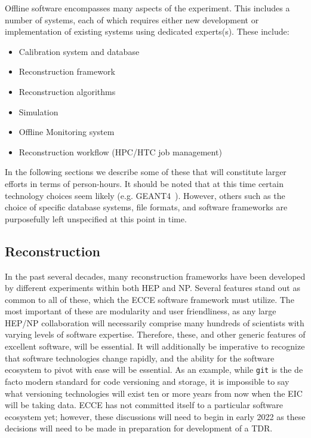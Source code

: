 

Offline software encompasses many aspects of the experiment. This includes a number of systems, each of which requires either new development or implementation of existing systems using dedicated experts(s). These include:

\begin{itemize}
    \item Calibration system and database
    \item Reconstruction framework
    \item Reconstruction algorithms
    \item Simulation
    \item Offline Monitoring system
    \item Reconstruction workflow (HPC/HTC job management)
\end{itemize}

In the following sections we describe some of these that will constitute larger efforts in terms of person-hours. It should be noted that at this time certain technology choices seem likely (e.g. GEANT4~\cite{ALLISON2016186}). However, others such as the choice of specific database systems, file formats, and software frameworks are purposefully left unspecified at this point in time.

\subsection{Reconstruction}\label{subsec:reconstruction}


In the past several decades, many reconstruction frameworks have been developed by different experiments within both HEP and NP. Several features stand out as common to all of these, which the ECCE software framework must utilize. The most important of these are modularity and user friendliness, as any large HEP/NP collaboration will necessarily comprise many hundreds of scientists with varying levels of software expertise. Therefore, these, and other generic features of excellent software, will be essential. It will additionally be imperative to recognize that software technologies change rapidly, and the ability for the software ecosystem to pivot with ease will be essential. As an example, while \texttt{git} is the de facto modern standard for code versioning and storage, it is impossible to say what versioning technologies will exist ten or more years from now when the EIC will be taking data. ECCE has not committed itself to a particular software ecosystem yet; however, these discussions will need to begin in early 2022 as these decisions will need to be made in preparation for development of a TDR.

